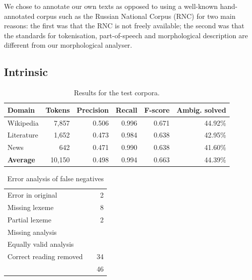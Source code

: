 \documentclass[11pt]{article}
\begin{document}
We chose to annotate our own texts as opposed to using a well-known hand-annotated corpus
such as the Russian National Corpus (RNC) for two main reasons: the first was that the 
RNC is not freely available; the second was that the standards for tokenisation, part-of-speech
and morphological description are different from our morphological analyser.

\subsection{Intrinsic}

\begin{table}
  \centering
  \begin{tabular}{|l|r|r|r|r|r|}
    \hline
    \textbf{Domain} & \textbf{Tokens} & \textbf{Precision} & \textbf{Recall} & \textbf{F-score} & \textbf{Ambig. solved} \\
    \hline
    Wikipedia       & 7,857      & 0.506        & 0.996    & 0.671 & 44.92\%  \\
    Literature      & 1,652      & 0.473        & 0.984    & 0.638 & 42.95\%  \\
    News            & 642        & 0.471        & 0.990    & 0.638 & 41.60\%  \\
    \hline
    \textbf{Average}& 10,150     & 0.498        &  0.994   & 0.663 & 44.39\% \\
    \hline
  \end{tabular}
  \caption{Results for the test corpora.}
  \label{table:results}
\end{table}


\begin{table}
  \centering
  \begin{tabular}{|l|r|r|}
    
    \hline
    Error in original        &   & 2 \\
    Missing lexeme           &   & 8  \\          %
    Partial lexeme           &   & 2  \\          %
    Missing analysis         &   &    \\        %
    Equally valid analysis   &   &    \\   %
    Correct reading removed  &   & 34   \\ %
    \hline
                             &   & 46 \\
    \hline
  \end{tabular}
  \caption{Error analysis of false negatives}
\end{table}
\end{document}
